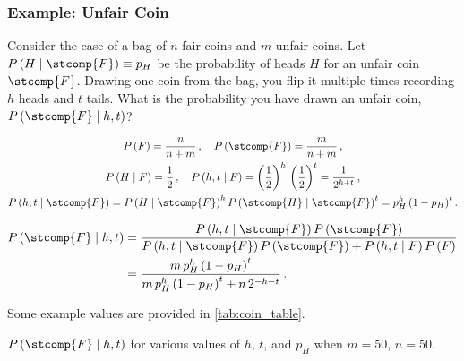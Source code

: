 \subsubsection{Example: Unfair Coin}
\label{stats:Bayes:unfair_coin}

Consider the case of a bag of $n$ fair coins and $m$ unfair coins.
Let $P\left(H \mid \stcomp{F}\right) \equiv p_{H}$ be the \apriori probability of heads $H$ for an unfair coin $\stcomp{F}$.
Drawing one coin from the bag, you flip it multiple times recording $h$ heads and $t$ tails.
What is the probability you have drawn an unfair coin, $P\left(\stcomp{F} \mid h,t\right)$?

\begin{equation}\label{eq:stats:Bayes:unfair_coin_setup}
\begin{gathered}
P\left(F\right) = \frac{n}{n+m}\,,\quad P\left(\stcomp{F}\right) = \frac{m}{n+m}\,, \\
P\left(H \mid F\right) = \frac{1}{2}\,,\quad P\left(h,t \mid F\right) = \left(\frac{1}{2}\right)^{h}\,\left(\frac{1}{2}\right)^{t} = \frac{1}{2^{h+t}}\,, \\
P\left(h,t \mid \stcomp{F}\right) = P\left(H \mid \stcomp{F}\right)^{h} P\left(\stcomp{H} \mid \stcomp{F}\right)^{t} = p_{H}^{h} \left(1-p_{H}\right)^{t}.
\end{gathered}
\end{equation}

\begin{equation}\label{eq:stats:Bayes:unfair_coin_solution}
\begin{split}
P\left(\stcomp{F} \mid h,t\right) &= \frac{
P\left(h,t \mid \stcomp{F}\right) P\left(\stcomp{F}\right)}{
P\left(h,t \mid \stcomp{F}\right) P\left(\stcomp{F}\right) + P\left(h,t \mid F\right) P\left(F\right)} \\
&= \frac{
m\,p_{H}^{h} \left(1-p_{H}\right)^{t}}{
m\,p_{H}^{h} \left(1-p_{H}\right)^{t} + n\,2^{-h-t}}\,.
\end{split}
\end{equation}

Some example values are provided in \cref{tab:coin_table}.

\begin{table}[H]
\centering
\begingroup
\renewcommand*{\arraystretch}{1}

\endgroup
\caption{
$P\left(\stcomp{F} \mid h,t\right)$ for various values of $h$, $t$, and $p_{H}$ when $m = 50$, $n = 50$.
}
\label{tab:coin_table}
\end{table}

